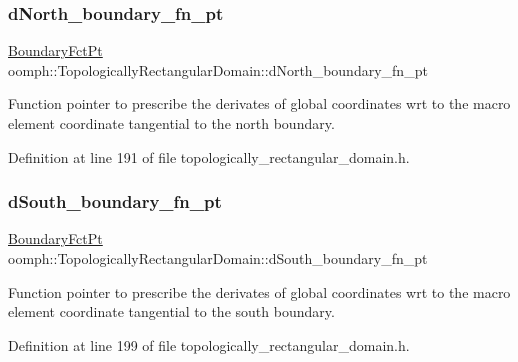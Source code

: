 \subsubsection{\texorpdfstring{d\+North\+\_\+boundary\+\_\+fn\+\_\+pt}{dNorth\_boundary\_fn\_pt}}
{\footnotesize\ttfamily \hyperlink{classoomph_1_1TopologicallyRectangularDomain_a8b2e24f5500d86c93aef509c5410e7cc}{Boundary\+Fct\+Pt} oomph\+::\+Topologically\+Rectangular\+Domain\+::d\+North\+\_\+boundary\+\_\+fn\+\_\+pt\hspace{0.3cm}{\ttfamily [private]}}



Function pointer to prescribe the derivates of global coordinates wrt to the macro element coordinate tangential to the north boundary. 



Definition at line 191 of file topologically\+\_\+rectangular\+\_\+domain.\+h.

\mbox{\label{classoomph_1_1TopologicallyRectangularDomain_aeaea9592b94d26a6a23f4f425ee7cd37}} 
\subsubsection{\texorpdfstring{d\+South\+\_\+boundary\+\_\+fn\+\_\+pt}{dSouth\_boundary\_fn\_pt}}
{\footnotesize\ttfamily \hyperlink{classoomph_1_1TopologicallyRectangularDomain_a8b2e24f5500d86c93aef509c5410e7cc}{Boundary\+Fct\+Pt} oomph\+::\+Topologically\+Rectangular\+Domain\+::d\+South\+\_\+boundary\+\_\+fn\+\_\+pt\hspace{0.3cm}{\ttfamily [private]}}



Function pointer to prescribe the derivates of global coordinates wrt to the macro element coordinate tangential to the south boundary. 



Definition at line 199 of file topologically\+\_\+rectangular\+\_\+domain.\+h.

\mbox{\label{classoomph_1_1TopologicallyRectangularDomain_a8e3abcbc75bab984017cb974d81db41e}} 
